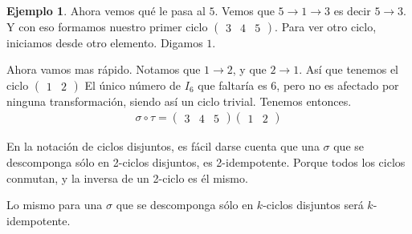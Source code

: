 \documentclass{article}
\theoremstyle{definition}
\newtheorem{ejemplo}{Ejemplo}[section]
\begin{document}
\begin{ejemplo}
    Ahora vemos qué le pasa al $5$. Vemos que $5\to 1\to 3$ es decir $5\to 3$. Y con eso formamos nuestro primer ciclo $\begin{pmatrix}
            3 & 4 & 5
        \end{pmatrix}$. Para ver otro ciclo, iniciamos desde otro elemento. Digamos $1$.

    Ahora vamos mas rápido. Notamos que $1\to 2$, y que $2\to 1$. Así que tenemos el ciclo $\begin{pmatrix}
            1 & 2
        \end{pmatrix}$
    El único número de $I_6$ que faltaría es $6$, pero no es afectado por ninguna transformación, siendo así un ciclo trivial. Tenemos entonces.
    \begin{align*}
        \sigma\circ \tau=\begin{pmatrix}
                             3 & 4 & 5
                         \end{pmatrix}\begin{pmatrix}
                                          1 & 2
                                      \end{pmatrix}
    \end{align*}
\end{ejemplo}
En la notación de ciclos disjuntos, es fácil darse cuenta que una $\sigma$ que se descomponga sólo en 2-ciclos disjuntos, es 2-idempotente. Porque todos los ciclos conmutan, y la inversa de un 2-ciclo es él mismo.

Lo mismo para una $\sigma$ que se descomponga sólo en $k$-ciclos disjuntos será $k$-idempotente.
\end{document}
